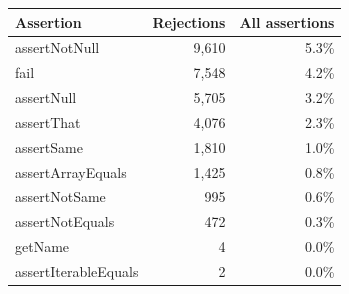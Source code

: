   \renewcommand{\theHreporttablerow}{rq6_assertion_type_rejections.\arabic{reporttablerow}}
  \setcounter{reporttablerow}{0}
  \begin{tabular}{lrr}
  \toprule
  Assertion & Rejections & All assertions \\
  \midrule
  {reporttablerow}\label{tabrow:rq6_assertion_type_rejections:assertNotNull}assertNotNull & 9,610 & 5.3\% \\
  {reporttablerow}\label{tabrow:rq6_assertion_type_rejections:fail}fail & 7,548 & 4.2\% \\
  {reporttablerow}\label{tabrow:rq6_assertion_type_rejections:assertNull}assertNull & 5,705 & 3.2\% \\
  {reporttablerow}\label{tabrow:rq6_assertion_type_rejections:assertThat}assertThat & 4,076 & 2.3\% \\
  {reporttablerow}\label{tabrow:rq6_assertion_type_rejections:assertSame}assertSame & 1,810 & 1.0\% \\
  {reporttablerow}\label{tabrow:rq6_assertion_type_rejections:assertArrayEquals}assertArrayEquals & 1,425 & 0.8\% \\
  {reporttablerow}\label{tabrow:rq6_assertion_type_rejections:assertNotSame}assertNotSame & 995 & 0.6\% \\
  {reporttablerow}\label{tabrow:rq6_assertion_type_rejections:assertNotEquals}assertNotEquals & 472 & 0.3\% \\
  {reporttablerow}\label{tabrow:rq6_assertion_type_rejections:getName}getName & 4 & 0.0\% \\
  {reporttablerow}\label{tabrow:rq6_assertion_type_rejections:assertIterableEquals}assertIterableEquals & 2 & 0.0\% \\
  \bottomrule
  \end{tabular}
